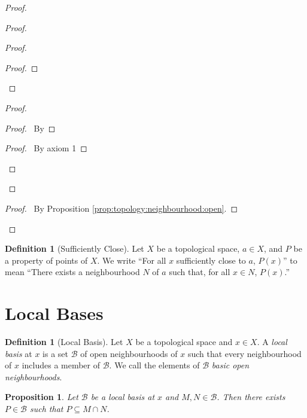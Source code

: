 \documentclass{report}
\let\qed\relax
\newtheorem{prop}[lm]{Proposition}
\theoremstyle{definition}
\newtheorem{df}[lm]{Definition}
\begin{document}
\begin{proof}
\begin{proof}
\begin{proof}
\begin{proof}
        \end{proof}
      \end{proof}
      \begin{proof}
        \begin{proof}
          \pf\ By 
        \end{proof}
        \begin{proof}
          \pf\ By axiom 1
        \end{proof}
      \end{proof}
    \end{proof}
    \begin{proof}
      \pf\ By Proposition \ref{prop:topology:neighbourhood:open}.
    \end{proof}
    \qed
  \end{proof}

  \begin{df}[Sufficiently Close]
    Let $X$ be a topological space, $a \in X$, and $P$ be a property of points
    of $X$. We write ``For all $x$ sufficiently close to $a$, $P(x)$'' to mean
    ``There exists a neighbourhood $N$ of $a$ such that, for all $x \in N$,
    $P(x)$.''
  \end{df}

  \section{Local Bases}

  \begin{df}[Local Basis]
    Let $X$ be a topological space and $x \in X$. A \emph{local basis} at $x$
    is a set $\mathcal{B}$ of open neighbourhoods of $x$ such that every
    neighbourhood of $x$ includes a member of $\mathcal{B}$. We call the
    elements of $\mathcal{B}$ \emph{basic open neighbourhoods}.
  \end{df}

  \begin{prop}
    Let $\mathcal{B}$ be a local basis at $x$ and $M, N \in \mathcal{B}$. Then
    there exists $P \in \mathcal{B}$ such that $P \subseteq M \cap N$.
  \end{prop}
\end{document}

